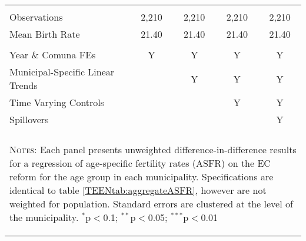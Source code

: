 \begin{table}[!htbp]
\begin{tabular}{@{\extracolsep{5pt}}lcccc}
 & & & & \\
Observations&2,210&2,210&2,210&2,210\\
Mean Birth Rate&21.40&21.40&21.40&21.40\\
\hline \\[-1.8ex] 
{\small Year \& Comuna FEs}             &Y&Y&Y&Y \\
{\small Municipal-Specific Linear Trends}& &Y&Y&Y \\
{\small Time Varying Controls}           & & &Y&Y \\
{\small Spillovers}                      & & & &Y \\
\hline \hline \\[-1.8ex]
\multicolumn{5}{p{13.8cm}}{\begin{footnotesize}
\textsc{Notes:} Each panel presents unweighted       
difference-in-difference results for a regression of  
age-specific fertility rates (ASFR) on the EC reform  
for the age group 
in each municipality.  Specifications are identical to
 table \ref{TEENtab:aggregateASFR}, however are not  
weighted for population. Standard errors are clustered
at the level of the municipality.
$^{*}$p$<$0.1; $^{**}$p$<$0.05; $^{***}$p$<$0.01\end{footnotesize}}
\normalsize\end{tabular}\end{table}
